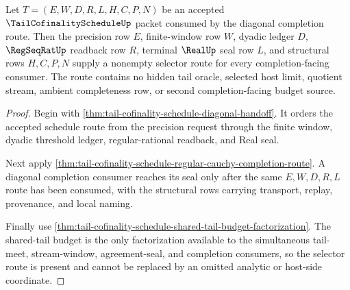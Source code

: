 \begin{theorem}
\label{thm:tail-cofinality-schedule-diagonal-selector-nonempty}
Let $T=(E,W,D,R,L,H,C,P,N)$ be an accepted $\TailCofinalityScheduleUp$ packet consumed by the diagonal completion route. Then the precision row $E$, finite-window row $W$, dyadic ledger $D$, $\RegSeqRatUp$ readback row $R$, terminal $\RealUp$ seal row $L$, and structural rows $H,C,P,N$ supply a nonempty selector route for every completion-facing consumer. The route contains no hidden tail oracle, selected host limit, quotient stream, ambient completeness row, or second completion-facing budget source.
\end{theorem}
\begin{proof}
Begin with \autoref{thm:tail-cofinality-schedule-diagonal-handoff}. It orders the accepted schedule route from the precision request through the finite window, dyadic threshold ledger, regular-rational readback, and Real seal.

Next apply \autoref{thm:tail-cofinality-schedule-regular-cauchy-completion-route}. A diagonal completion consumer reaches its seal only after the same $E,W,D,R,L$ route has been consumed, with the structural rows carrying transport, replay, provenance, and local naming.

Finally use \autoref{thm:tail-cofinality-schedule-shared-tail-budget-factorization}. The shared-tail budget is the only factorization available to the simultaneous tail-meet, stream-window, agreement-seal, and completion consumers, so the selector route is present and cannot be replaced by an omitted analytic or host-side coordinate.
\end{proof}

